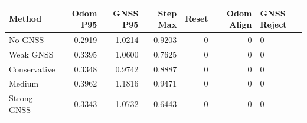 \begin{tabular}{lrrrrr}
\hline
Method & Odom P95 & GNSS P95 & Step Max & Reset & Odom Align & GNSS Reject \\
\hline
No GNSS & 0.2919 & 1.0214 & 0.9203 & 0 & 0 & 0 \\
Weak GNSS & 0.3395 & 1.0600 & 0.7625 & 0 & 0 & 0 \\
Conservative & 0.3348 & 0.9742 & 0.8887 & 0 & 0 & 0 \\
Medium & 0.3962 & 1.1816 & 0.9471 & 0 & 0 & 0 \\
Strong GNSS & 0.3343 & 1.0732 & 0.6443 & 0 & 0 & 0 \\
\hline
\end{tabular}
